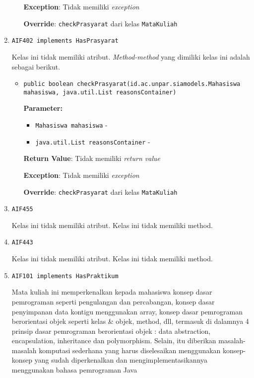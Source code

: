 \documentclass{article}
\begin{document}
\begin{enumerate}
\begin{itemize}
\textbf{Exception}: Tidak memiliki \textit{exception}

\textbf{Override}: \texttt{checkPrasyarat} dari kelas \texttt{MataKuliah}

\end{itemize}
\item \texttt{AIF402 implements HasPrasyarat}



Kelas ini tidak memiliki atribut. \textit{Method-method} yang dimiliki kelas ini adalah sebagai berikut.
\begin{itemize}
\item \texttt{public boolean checkPrasyarat(id.ac.unpar.siamodels.Mahasiswa mahasiswa, java.util.List reasonsContainer)}



\textbf{Parameter:}
\begin{itemize}
\item \texttt{Mahasiswa mahasiswa} - 
\item \texttt{java.util.List reasonsContainer} - 
\end{itemize}
\textbf{Return Value}: Tidak memiliki \textit{return value}

\textbf{Exception}: Tidak memiliki \textit{exception}

\textbf{Override}: \texttt{checkPrasyarat} dari kelas \texttt{MataKuliah}

\end{itemize}
\item \texttt{AIF455}



Kelas ini tidak memiliki atribut. Kelas ini tidak memiliki method. \item \texttt{AIF443}



Kelas ini tidak memiliki atribut. Kelas ini tidak memiliki method. \item \texttt{AIF101 implements HasPraktikum}

Mata kuliah ini memperkenalkan kepada mahasiswa konsep dasar pemrograman 
 seperti pengulangan dan percabangan, konsep dasar penyimpanan data kontigu 
 menggunakan array, konsep dasar pemrograman berorientasi objek seperti kelas 
 \& objek, method, dll, termasuk di dalamnya 4 prinsip dasar pemrograman 
 berorientasi objek : data abstraction, encapsulation, inheritance dan 
 polymorphism. Selain, itu diberikan masalah-masalah komputasi sederhana 
 yang harus diselesaikan menggunakan konsep-konsep yang  sudah diperkenalkan 
 dan mengimplementasikannya menggunakan bahasa pemrograman Java


\end{enumerate}
\end{document}
